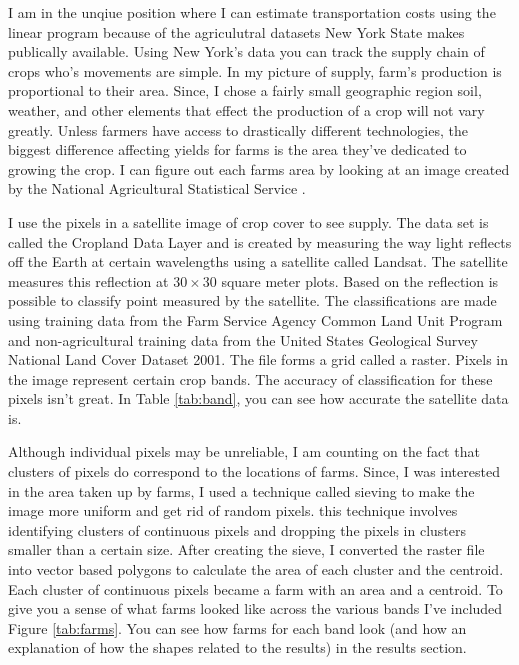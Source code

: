 \documentclass{report}
\begin{document}
I am in the unqiue position where I can estimate transportation costs using the linear program because of the agriculutral datasets New York State makes publically available. Using New York's data you can track the supply chain of crops who's movements are simple. In my picture of supply, farm's production is proportional to their area. Since, I chose a fairly small geographic region soil, weather, and other elements that effect the production of a crop will not vary greatly. Unless farmers have access to drastically different technologies, the biggest difference affecting yields for farms is the area they've dedicated to growing the crop. I can figure out each farms area by looking at an image created by the National Agricultural Statistical Service \cite{nass}.

I use the pixels in a satellite image of crop cover to see supply. The data set is called the Cropland Data Layer and is created by measuring the way light reflects off the Earth at certain wavelengths using a satellite called Landsat. The satellite measures this reflection at $30 \times 30$ square meter plots. Based on the reflection is possible to classify point measured by the satellite. The classifications are made using training data from the Farm Service Agency Common Land Unit Program and non-agricultural training data from the United States Geological Survey National Land Cover Dataset 2001. The file forms a grid called a raster. Pixels in the image represent certain crop bands. The accuracy of classification for these pixels isn't great. In Table \ref{tab:band}, you can see how accurate the satellite data is.

Although individual pixels may be unreliable, I am counting on the fact that clusters of pixels do  correspond to the locations of farms. Since, I was interested in the area taken up by farms, I used a technique called sieving to make the image more uniform and get rid of random pixels. this technique involves identifying clusters of continuous pixels and dropping the pixels in clusters smaller than a certain size. After creating the sieve, I converted the raster file into vector based polygons to calculate the area of each cluster and the centroid. Each cluster of continuous pixels became a farm with an area and a centroid. To give you a sense of what farms looked like across the various bands I've included Figure \ref{tab:farms}. You can see how farms for each band look (and how an explanation of how the shapes related to the results) in the results section.
\end{document}
